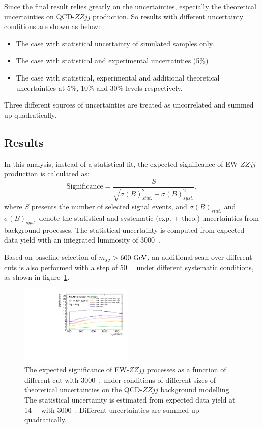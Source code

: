 Since the final result relies greatly on the uncertainties, especially the theoretical uncertainties on QCD-$ZZjj$ production.
So results with different uncertainty conditions are shown as below:
\begin{itemize}
	\item The case with statistical uncertainty of simulated samples only.
	\item The case with statistical and experimental uncertainties (5\%)
	\item The case with statistical, experimental and additional theoretical uncertainties at 5\%, 10\% and 30\% levels respectively.
\end{itemize}
Three different sources of uncertainties are treated as uncorrelated and summed up quadratically.

\subsection{Results}

In this analysis, instead of a statistical fit, the expected significance of EW-$ZZjj$ production is calculated as:
\begin{equation}
  \text{Significance} = \frac{S}{\sqrt{\sigma(B)_{stat.}^2 + \sigma(B)_{syst.}^2}},
\end{equation}
where $S$ presents the number of selected signal events,
and $\sigma(B)_{stat.}$ and $\sigma(B)_{syst.}$ denote the statistical and systematic (exp. + theo.) uncertainties from background processes.
The statistical uncertainty is computed from expected data yield with an integrated luminosity of 3000~\ifb.

Based on baseline selection of $m_{jj} > 600~\text{Ge\kern -0.1em V}$, an additional scan over different \mjj cuts is also performed with a step of 50~\gev~
under different systematic conditions, as shown in figure~\ref{fig:mjj_scan}.
\begin{figure}[!htbp]
\centering
\includegraphics[width=0.48\textwidth]{figures/VBSZZ/hllhc/significance_noshape_0_noratio.pdf}
\caption{
The expected significance of EW-$ZZjj$ processes as a function of different \mjj cut with 3000~\ifb,
under conditions of different sizes of theoretical uncertainties on the QCD-$ZZjj$ background modelling.
The statistical uncertainty is estimated from expected data yield at 14~\tev~ with 3000~\ifb.
Different uncertainties are summed up quadratically.
}
\label{fig:mjj_scan}
\end{figure}

